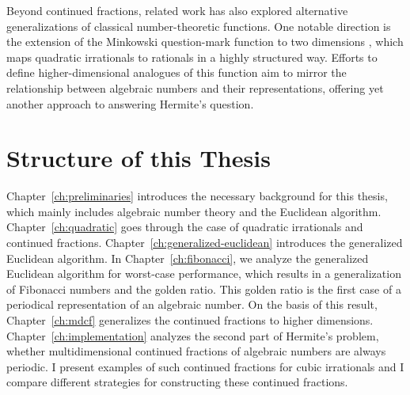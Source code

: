 Beyond continued fractions, related work has also explored alternative
generalizations of classical number-theoretic functions.
One notable direction is the extension of the Minkowski question-mark function
to two dimensions \cite{Beaver04}, which maps quadratic irrationals to rationals in a highly structured way.
Efforts to define higher-dimensional analogues of this function aim to mirror
the relationship between algebraic numbers and their representations,
offering yet another approach to answering Hermite’s question.

\section{Structure of this Thesis}

Chapter~\ref{ch:preliminaries} introduces the necessary background for this thesis,
which mainly includes algebraic number theory and the Euclidean algorithm.
Chapter~\ref{ch:quadratic} goes through the case of quadratic irrationals
and continued fractions.
Chapter~\ref{ch:generalized-euclidean} introduces the generalized Euclidean algorithm.
In Chapter~\ref{ch:fibonacci}, we analyze the generalized Euclidean algorithm for worst-case performance,
which results in a generalization of Fibonacci numbers and the golden ratio.
This golden ratio is the first case of a periodical representation of an algebraic number.
On the basis of this result, Chapter~\ref{ch:mdcf} generalizes the continued fractions to higher dimensions.
Chapter~\ref{ch:implementation} analyzes the second part of Hermite's problem,
whether multidimensional continued fractions of algebraic numbers are always periodic.
I present examples of such continued fractions for cubic irrationals and I
compare different strategies for constructing these continued fractions.
